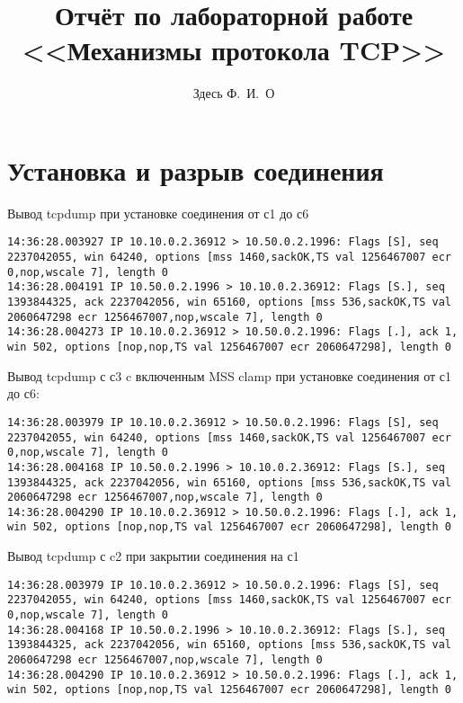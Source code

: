 \documentclass[a4paper,12pt]{article}
\title{Отчёт по лабораторной работе \\ <<Механизмы протокола TCP>>}
\author{Здесь Ф.~И.~О}
\begin{document}
\maketitle

\tableofcontents


\section{Установка и разрыв соединения}

Вывод tcpdump при установке соединения от с1 до с6
\begin{Verbatim}
14:36:28.003927 IP 10.10.0.2.36912 > 10.50.0.2.1996: Flags [S], seq 2237042055, win 64240, options [mss 1460,sackOK,TS val 1256467007 ecr 0,nop,wscale 7], length 0
14:36:28.004191 IP 10.50.0.2.1996 > 10.10.0.2.36912: Flags [S.], seq 1393844325, ack 2237042056, win 65160, options [mss 536,sackOK,TS val 2060647298 ecr 1256467007,nop,wscale 7], length 0
14:36:28.004273 IP 10.10.0.2.36912 > 10.50.0.2.1996: Flags [.], ack 1, win 502, options [nop,nop,TS val 1256467007 ecr 2060647298], length 0
\end{Verbatim}

Вывод tcpdump с с3 c включенным MSS clamp при установке соединения от с1 до с6:
\begin{Verbatim}
14:36:28.003979 IP 10.10.0.2.36912 > 10.50.0.2.1996: Flags [S], seq 2237042055, win 64240, options [mss 1460,sackOK,TS val 1256467007 ecr 0,nop,wscale 7], length 0
14:36:28.004168 IP 10.50.0.2.1996 > 10.10.0.2.36912: Flags [S.], seq 1393844325, ack 2237042056, win 65160, options [mss 536,sackOK,TS val 2060647298 ecr 1256467007,nop,wscale 7], length 0
14:36:28.004290 IP 10.10.0.2.36912 > 10.50.0.2.1996: Flags [.], ack 1, win 502, options [nop,nop,TS val 1256467007 ecr 2060647298], length 0
\end{Verbatim}

Вывод tcpdump с c2 при закрытии соединения на с1
\begin{Verbatim}
14:36:28.003979 IP 10.10.0.2.36912 > 10.50.0.2.1996: Flags [S], seq 2237042055, win 64240, options [mss 1460,sackOK,TS val 1256467007 ecr 0,nop,wscale 7], length 0
14:36:28.004168 IP 10.50.0.2.1996 > 10.10.0.2.36912: Flags [S.], seq 1393844325, ack 2237042056, win 65160, options [mss 536,sackOK,TS val 2060647298 ecr 1256467007,nop,wscale 7], length 0
14:36:28.004290 IP 10.10.0.2.36912 > 10.50.0.2.1996: Flags [.], ack 1, win 502, options [nop,nop,TS val 1256467007 ecr 2060647298], length 0
\end{Verbatim}
\end{document}
